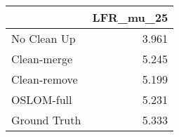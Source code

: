 \begin{tabular}{lr}
\toprule
{} & LFR_mu_25 \\
\midrule
No Clean Up  &     3.961 \\
Clean-merge  &     5.245 \\
Clean-remove &     5.199 \\
OSLOM-full   &     5.231 \\
Ground Truth &     5.333 \\
\bottomrule
\end{tabular}
